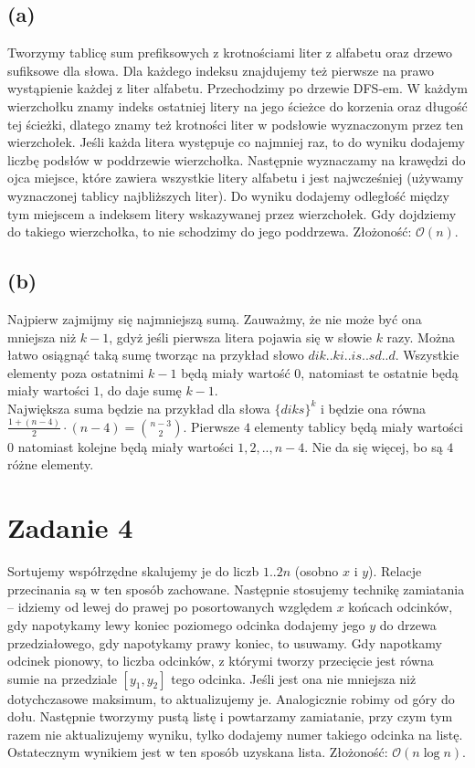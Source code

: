 \documentclass[12pt, a4paper]{article}
\newcommand{\MCALO}{\mathcal{O}}
\begin{document}
\subsection*{(a)}
Tworzymy tablicę sum prefiksowych z krotnościami liter z alfabetu oraz drzewo
sufiksowe dla słowa. Dla każdego indeksu znajdujemy też pierwsze na prawo
wystąpienie każdej z liter alfabetu. Przechodzimy po drzewie DFS-em. W każdym
wierzchołku znamy indeks ostatniej litery na jego ścieżce do korzenia oraz
długość tej ścieżki, dlatego znamy też krotności liter w podsłowie wyznaczonym
przez ten wierzchołek. Jeśli każda litera występuje co najmniej raz, to do
wyniku dodajemy liczbę podsłów w poddrzewie wierzchołka. Następnie wyznaczamy
na krawędzi do ojca miejsce, które zawiera wszystkie litery alfabetu i jest
najwcześniej (używamy wyznaczonej tablicy najbliższych liter). Do wyniku
dodajemy odległość między tym miejscem a indeksem litery wskazywanej przez
wierzchołek. Gdy dojdziemy do takiego wierzchołka, to nie schodzimy do jego
poddrzewa.
Złożoność: $\MCALO(n)$.

\subsection*{{(b)}}
Najpierw zajmijmy się najmniejszą sumą. Zauważmy, że nie może być ona mniejsza
niż $k-1$, gdyż jeśli pierwsza litera pojawia się w słowie $k$ razy. Można
łatwo osiągnąć taką sumę tworząc na przykład słowo $dik..ki..is..sd..d$.
Wszystkie elementy poza ostatnimi $k-1$ będą miały wartość $0$, natomiast te
ostatnie będą miały wartości $1$, do daje sumę $k-1$.\\ Największa suma będzie
na przykład dla słowa $\{diks\}^{k}$ i będzie ona równa $\frac{1 + (n-4)}{2}
\cdot (n-4) = \binom{n-3}{2}$. Pierwsze $4$ elementy tablicy będą miały
wartości $0$ natomiast kolejne będą miały wartości $1,2,..,n-4$. Nie da się więcej, bo
są $4$ różne elementy.

\section*{Zadanie 4}
Sortujemy współrzędne skalujemy je do liczb $1..2n$ (osobno $x$ i $y$). Relacje
przecinania są w ten sposób zachowane. Następnie stosujemy technikę zamiatania
-- idziemy od lewej do prawej po posortowanych względem $x$ końcach odcinków,
gdy napotykamy lewy koniec poziomego odcinka dodajemy jego $y$ do drzewa
przedziałowego, gdy napotykamy prawy koniec, to usuwamy. Gdy napotkamy odcinek
pionowy, to liczba odcinków, z którymi tworzy przecięcie jest równa sumie na
przedziale $[y_1,y_2]$ tego odcinka. Jeśli jest ona nie mniejsza niż
dotychczasowe maksimum, to aktualizujemy je. Analogicznie robimy od góry do
dołu. Następnie tworzymy pustą listę i powtarzamy zamiatanie, przy czym tym
razem nie aktualizujemy wyniku, tylko dodajemy numer takiego odcinka na listę.
Ostatecznym wynikiem jest w ten sposób uzyskana lista.
Złożoność: $\MCALO(n\log{n})$.
\end{document}
